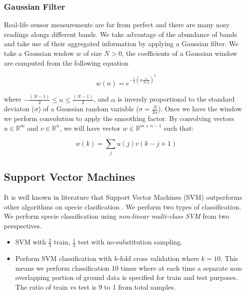 \documentclass[remotesensing,article,accept,moreauthors,pdftex,12pt,a4paper]{mdpi}
\begin{document}
\subsubsection{Gaussian Filter}

Real-life sensor measurements are far from perfect and there are many nosy readings alongs different bands. We take advantage of the abundance of bands and take use of their aggregated information by applying a Gaussian filter. We take a Gaussian wndow $w$ of size $N > 0$, the coefficients of a Gaussian window are computed from the following equation

\begin{equation}
w(n) = e^{-\frac{1}{2}(\alpha \frac{n}{N/2})^2}
\end{equation}  

where $-\frac{(N-1)}{2} \leq n \leq \frac{(N-1)}{2}$, and $\alpha$ is inversly proportional to the standard deviaton ($\sigma$) of a Gaussian random variable ($\sigma = \frac{N}{2\alpha}$). Once we have the window we perform convolution to apply the smoothing factor. By convolving vectors $u \in \mathbb{R}^m$ and $v\in \mathbb{R}^n$, we will have vector $w\in \mathbb{R}^{m+n-1}$ such that: 

\begin{equation}
w(k)=\sum_j u(j)v(k-j+1)
\end{equation} 


\subsection{Support Vector Machines}

It is well known in literature that Support Vector Machines (SVM) outperforms other algorithms on specie clasification \cite{colgan2012mapping, baldeck2014landscape, cho2012mapping}. We perform two types of classification. We perform specie classification using \textit{non-linear multi-class SVM} from two perspectives. 


\begin{itemize}
\item SVM with $\frac{2}{3}$ train, $\frac{1}{3}$ test with no-substitution sampling.
\item Perform SVM classification with $k$-fold cross validation where $k=10$. This means we perform classification 10 times where at each time a separate non-overlapping portion of ground data is specified for train and test purposes. The ratio of train vs test is 9 to 1 from total samples.
\end{itemize}
\end{document}
